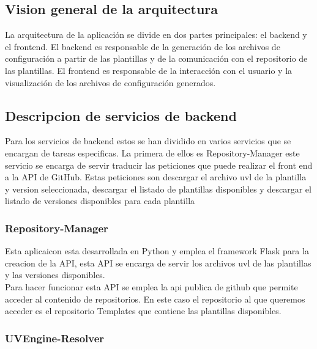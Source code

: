 \documentclass[12pt, a4paper, twoside]{article}
\begin{document}
\subsection{Vision general de la arquitectura }
La arquitectura de la aplicación se divide en dos partes principales: el backend y el frontend.
El backend es responsable de la generación de los archivos de configuración a partir de las plantillas y de la comunicación con el repositorio de las plantillas.
El frontend es responsable de la interacción con el usuario y la visualización de los archivos de configuración generados.
\subsection{Descripcion de servicios de backend}
Para los servicios de backend estos se han dividido en varios servicios que se encargan de tareas especificas.
La primera de ellos es Repository-Manager  este servicio se encarga de servir traducir las peticiones que puede realizar el front end a la API de GitHub.
Estas peticiones son descargar el archivo uvl de la plantilla y version seleccionada, descargar el listado de plantillas disponibles y descargar el listado de versiones disponibles para cada plantilla
\newpage
\subsubsection{Repository-Manager}
Esta aplicaicon esta desarrollada en Python y emplea el framework Flask para la creacion de la API, esta API se encarga de servir los archivos uvl de las plantillas y las versiones disponibles.
\\Para hacer funcionar esta API se emplea la api publica de github que permite acceder al contenido de repositorios. 
En este caso el repositorio al que queremos acceder es el repositorio Templates que contiene las plantillas disponibles.

\newpage
\subsubsection{UVEngine-Resolver}
\end{document}
